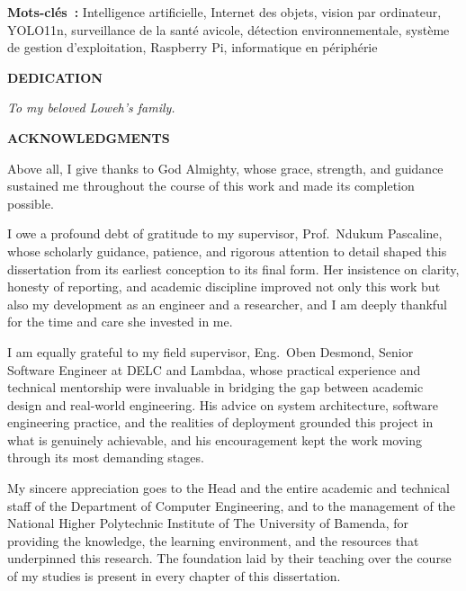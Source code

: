 \documentclass[12pt,a4paper]{report}
\begin{document}
\vspace{0.8cm}
\noindent\textbf{Mots-cl\'es~:} Intelligence artificielle, Internet des objets, vision par ordinateur, YOLO11n, surveillance de la sant\'e avicole, d\'etection environnementale, syst\`eme de gestion d'exploitation, Raspberry Pi, informatique en p\'eriph\'erie

\clearpage
\begin{center}
{\Large\bfseries DEDICATION}
\end{center}
\vspace{3cm}
\begin{center}
{\large\itshape To my beloved Loweh's family.}
\end{center}

\clearpage
\begin{center}
{\Large\bfseries ACKNOWLEDGMENTS}
\end{center}
\vspace{1cm}

Above all, I give thanks to God Almighty, whose grace, strength, and guidance sustained me throughout the course of this work and made its completion possible.

I owe a profound debt of gratitude to my supervisor, Prof.\ Ndukum Pascaline, whose scholarly guidance, patience, and rigorous attention to detail shaped this dissertation from its earliest conception to its final form. Her insistence on clarity, honesty of reporting, and academic discipline improved not only this work but also my development as an engineer and a researcher, and I am deeply thankful for the time and care she invested in me.

I am equally grateful to my field supervisor, Eng.\ Oben Desmond, Senior Software Engineer at DELC and Lambdaa, whose practical experience and technical mentorship were invaluable in bridging the gap between academic design and real-world engineering. His advice on system architecture, software engineering practice, and the realities of deployment grounded this project in what is genuinely achievable, and his encouragement kept the work moving through its most demanding stages.

My sincere appreciation goes to the Head and the entire academic and technical staff of the Department of Computer Engineering, and to the management of the National Higher Polytechnic Institute of The University of Bamenda, for providing the knowledge, the learning environment, and the resources that underpinned this research. The foundation laid by their teaching over the course of my studies is present in every chapter of this dissertation.
\end{document}
